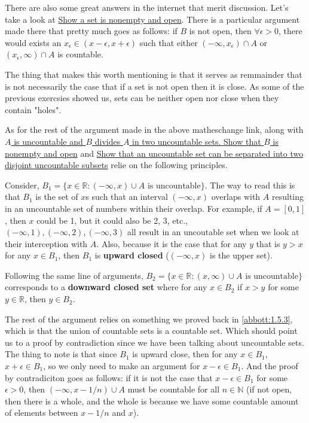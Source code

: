 There are also some great answers in the internet that merit discussion.
Let's take a look at
\href{https://math.stackexchange.com/questions/3042397/show-a-set-is-nonempty-and-open}{Show a set is nonempty and open}.
There is a particular argument made there that pretty much goes as follows: if $B$ is not open, then
$\forall \epsilon >0$, there would exists an $x_\epsilon \in (x-\epsilon , x+\epsilon)$ such that
either $(-\infty , x_\epsilon) \cap A$ or $(x_\epsilon , \infty) \cap A$ is countable.

The thing that makes this worth mentioning is that it serves as remmainder that is not necessarily the case that if
a set is not open then it is close.
As some of the previous exercsies showed us, sets can be neither open nor close when they contain "holes".

As for the rest of the argument made in the above matheschange link, along with
\href{https://math.stackexchange.com/questions/1800147/a-is-uncountable-and-b-divides-a-in-two-uncountable-sets-show-that-b-is}{$A$
is uncountable and $B$ divides $A$ in two uncountable sets. Show that $B$ is nonempty and open}
and
\href{https://math.stackexchange.com/questions/4071927/show-that-an-uncountable-set-can-be-separated-into-two-disjoint-uncountable-subs}{
    Show that an uncountable set can be separated into two disjoint uncountable subsets}
relie on the following principles.

Consider, $B_1 = \{ x\in\mathbb{R} : (-\infty,x) \cup A \text{ is uncountable} \}$.
The way to read this is that $B_1$ is the set of $x$s such that an interval $(-\infty,x)$ overlaps with $A$ resulting in an uncountable set of numbers within their overlap.
For example, if $A = [0,1]$, then $x$ could be 1, but it could also be 2, 3, etc., $(-\infty,1), (-\infty, 2), (-\infty,3)$ all result
in an uncoutable set when we look at their interception with $A$.
Also, because it is the case that for any $y$ that is $y > x$ for any $x \in B_1$, then $B_1$ is \textbf{upward closed} ($(-\infty,x)$ is the upper set).

Following the same line of arguments, $B_2 = \{ x\in\mathbb{R} : (x,\infty) \cup A \text{ is uncountable} \}$
corresponds to a \textbf{downward closed set} where for any $x\in B_2$ if $x > y$ for some $y\in\mathbb{R}$, then
$y \in B_2$.

The rest of the argument relies on something we proved back in \ref{abbott:1.5.3}, which is that the union
of countable sets is a countable set.
Which should point us to a proof by contradiction since we have been talking about uncountable sets.
The thing to note is that since $B_1$ is upward close, then for any $x\in B_1$, $x+\epsilon \in B_1$,
so we only need to make an argument for $x-\epsilon \in B_1$.
And the proof by contradiciton goes as follows: if it is not the case that $x-\epsilon \in B_1$ for some $\epsilon > 0$,
then $(-\infty, x-1/n) \cup A$ must be countable for all $n\in\mathbb{N}$
(if not open, then there is a whole, and the whole is because we have some countable amount of elements between $x-1/n$ and $x$).

